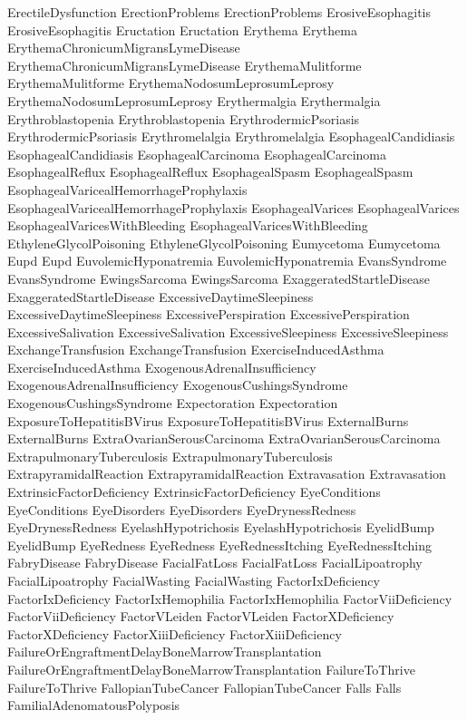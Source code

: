  ErectileDysfunction
 ErectionProblems
 ErectionProblems
 ErosiveEsophagitis
 ErosiveEsophagitis
 Eructation
 Eructation
 Erythema
 Erythema
 ErythemaChronicumMigransLymeDisease
 ErythemaChronicumMigransLymeDisease
 ErythemaMulitforme
 ErythemaMulitforme
 ErythemaNodosumLeprosumLeprosy
 ErythemaNodosumLeprosumLeprosy
 Erythermalgia
 Erythermalgia
 Erythroblastopenia
 Erythroblastopenia
 ErythrodermicPsoriasis
 ErythrodermicPsoriasis
 Erythromelalgia
 Erythromelalgia
 EsophagealCandidiasis
 EsophagealCandidiasis
 EsophagealCarcinoma
 EsophagealCarcinoma
 EsophagealReflux
 EsophagealReflux
 EsophagealSpasm
 EsophagealSpasm
 EsophagealVaricealHemorrhageProphylaxis
 EsophagealVaricealHemorrhageProphylaxis
 EsophagealVarices
 EsophagealVarices
 EsophagealVaricesWithBleeding
 EsophagealVaricesWithBleeding
 EthyleneGlycolPoisoning
 EthyleneGlycolPoisoning
 Eumycetoma
 Eumycetoma
 Eupd
 Eupd
 EuvolemicHyponatremia
 EuvolemicHyponatremia
 EvansSyndrome
 EvansSyndrome
 EwingsSarcoma
 EwingsSarcoma
 ExaggeratedStartleDisease
 ExaggeratedStartleDisease
 ExcessiveDaytimeSleepiness
 ExcessiveDaytimeSleepiness
 ExcessivePerspiration
 ExcessivePerspiration
 ExcessiveSalivation
 ExcessiveSalivation
 ExcessiveSleepiness
 ExcessiveSleepiness
 ExchangeTransfusion
 ExchangeTransfusion
 ExerciseInducedAsthma
 ExerciseInducedAsthma
 ExogenousAdrenalInsufficiency
 ExogenousAdrenalInsufficiency
 ExogenousCushingsSyndrome
 ExogenousCushingsSyndrome
 Expectoration
 Expectoration
 ExposureToHepatitisBVirus
 ExposureToHepatitisBVirus
 ExternalBurns
 ExternalBurns
 ExtraOvarianSerousCarcinoma
 ExtraOvarianSerousCarcinoma
 ExtrapulmonaryTuberculosis
 ExtrapulmonaryTuberculosis
 ExtrapyramidalReaction
 ExtrapyramidalReaction
 Extravasation
 Extravasation
 ExtrinsicFactorDeficiency
 ExtrinsicFactorDeficiency
 EyeConditions
 EyeConditions
 EyeDisorders
 EyeDisorders
 EyeDrynessRedness
 EyeDrynessRedness
 EyelashHypotrichosis
 EyelashHypotrichosis
 EyelidBump
 EyelidBump
 EyeRedness
 EyeRedness
 EyeRednessItching
 EyeRednessItching
 FabryDisease
 FabryDisease
 FacialFatLoss
 FacialFatLoss
 FacialLipoatrophy
 FacialLipoatrophy
 FacialWasting
 FacialWasting
 FactorIxDeficiency
 FactorIxDeficiency
 FactorIxHemophilia
 FactorIxHemophilia
 FactorViiDeficiency
 FactorViiDeficiency
 FactorVLeiden
 FactorVLeiden
 FactorXDeficiency
 FactorXDeficiency
 FactorXiiiDeficiency
 FactorXiiiDeficiency
 FailureOrEngraftmentDelayBoneMarrowTransplantation
 FailureOrEngraftmentDelayBoneMarrowTransplantation
 FailureToThrive
 FailureToThrive
 FallopianTubeCancer
 FallopianTubeCancer
 Falls
 Falls
 FamilialAdenomatousPolyposis
